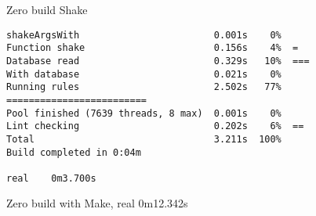 Zero build Shake

\begin{lstlisting}
shakeArgsWith                        0.001s    0%
Function shake                       0.156s    4%  =
Database read                        0.329s   10%  ===
With database                        0.021s    0%
Running rules                        2.502s   77%  =========================
Pool finished (7639 threads, 8 max)  0.001s    0%
Lint checking                        0.202s    6%  ==
Total                                3.211s  100%
Build completed in 0:04m

real    0m3.700s
\end{lstlisting}

Zero build with Make, real    0m12.342s

